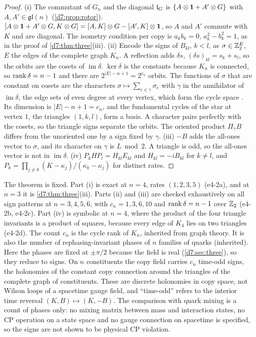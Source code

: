 \begin{proof}
(i) The commutant of $G_n$ and the diagonal $\mathfrak l_G$ is $\{A\otimes\mathbf 1+A'\otimes G\}$ with $A,A'\in\mathfrak{gl}(n)$ (\cref{d7:prop:rotor}).
$[A\otimes\mathbf 1+A'\otimes G,K\otimes G]=[A,K]\otimes G-[A',K]\otimes\mathbf 1$, so $A$ and $A'$ commute with $K$ and are diagonal. The isometry condition per copy is
$a_kb_k=0$, $a_k^2-b_k^2=1$, as in the proof of \cref{d7:thm:three}(iii). (ii) Encode the signs of $B_{kl}$, $k<l$, as $\sigma\in\mathbb{Z}_2^E$, $E$ the
edges of the complete graph $K_n$. A reflection adds $\delta s$, $(\delta s)_{kl}=s_k+s_l$, so the orbits are the cosets of $\operatorname{im}\delta$.
$\ker\delta$ is the constants because $K_n$ is connected, so $\operatorname{rank}\delta=n-1$ and there are $2^{|E|-n+1}=2^{c_n}$ orbits. The functions of $\sigma$ that are
constant on cosets are the characters $\sigma\mapsto\sum_{e\in\gamma}\sigma_e$ with $\gamma$ in the annihilator of $\operatorname{im}\delta$, the edge sets of even
degree at every vertex, which form the cycle space \cite{Diestel17}. Its dimension is $|E|-n+1=c_n$, and the fundamental cycles of the star at
vertex $1$, the triangles $(1,k,l)$, form a basis. A character pairs perfectly with the cosets, so the triangle signs separate the orbits. The
oriented product $\Pi_\gamma B$ differs from the unoriented one by a sign fixed by $\gamma$. (iii) $-B$ adds the all-ones vector to $\sigma$, and its
character on $\gamma$ is $L\bmod2$. A triangle is odd, so the all-ones vector is not in $\operatorname{im}\delta$. (iv) $P_kHP_l=H_{kl}E_{kl}$ and
$H_{kl}=-iB_{kl}$ for $k\neq l$, and $P_k=\prod_{j\neq k}(K-\kappa_j)/(\kappa_k-\kappa_j)$ for distinct rates.
\end{proof}

The theorem is fixed. Part (i) is exact at $n=4$, rates $(1,2,3,5)$ (e4-2a), and at $n=3$ it is \cref{d7:thm:three}(iii). Parts (ii) and (iii)
are checked exhaustively on all sign patterns at $n=3,4,5,6$, with $c_n=1,3,6,10$ and $\operatorname{rank}\delta=n-1$ over $\mathbb{Z}_2$ (e4-2b, e4-2c). Part (iv) is
symbolic at $n=4$, where the product of the four triangle invariants is a product of squares, because every edge of $K_4$ lies on two
triangles (e4-2d). The count $c_n$ is the cycle rank of $K_n$, inherited from graph theory. It is also the number of rephasing-invariant phases of $n$
families of quarks \cite{KobayashiMaskawa73,BrancoLavouraSilva99} (inherited). Here the phases are fixed at $\pm\pi/2$ because the field is real
(\cref{d7:sec:three}), so they reduce to signs. On $n$ constituents the copy field carries $c_n$ time-odd signs, the holonomies of the
constant copy connection around the triangles of the complete graph of constituents. These are discrete holonomies in copy space, not Wilson
loops of a spacetime gauge field, and ``time-odd'' refers to the interior time reversal $(K,B)\mapsto(K,-B)$. The comparison with quark mixing
is a count of phases only: no mixing matrix between mass and interaction states, no CP operation on a state space and no gauge connection on
spacetime is specified, so the signs are not shown to be physical CP violation.

